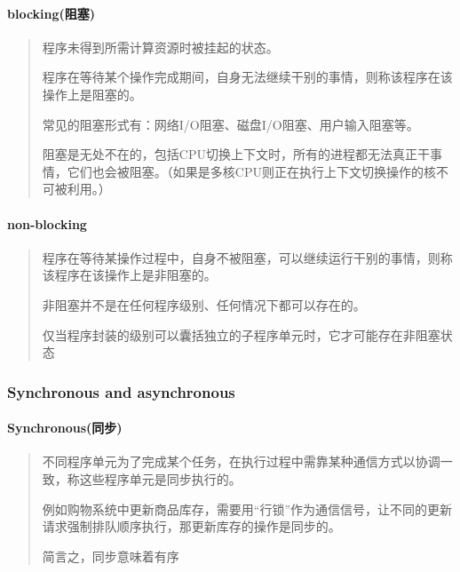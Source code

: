 \documentclass[11pt]{article}
\begin{document}
    \hypertarget{blockingux963bux585e}{%
\paragraph{blocking(阻塞)}\label{blockingux963bux585e}}

\begin{quote}
程序未得到所需计算资源时被挂起的状态。

程序在等待某个操作完成期间，自身无法继续干别的事情，则称该程序在该操作上是阻塞的。

常见的阻塞形式有：网络I/O阻塞、磁盘I/O阻塞、用户输入阻塞等。

阻塞是无处不在的，包括CPU切换上下文时，所有的进程都无法真正干事情，它们也会被阻塞。（如果是多核CPU则正在执行上下文切换操作的核不可被利用。）
\end{quote}

\hypertarget{non-blocking}{%
\paragraph{non-blocking}\label{non-blocking}}

\begin{quote}
程序在等待某操作过程中，自身不被阻塞，可以继续运行干别的事情，则称该程序在该操作上是非阻塞的。

非阻塞并不是在任何程序级别、任何情况下都可以存在的。

仅当程序封装的级别可以囊括独立的子程序单元时，它才可能存在非阻塞状态
\end{quote}

    \hypertarget{synchronous-and-asynchronous}{%
\subsubsection{Synchronous and
asynchronous}\label{synchronous-and-asynchronous}}

    \hypertarget{synchronousux540cux6b65}{%
\paragraph{Synchronous(同步)}\label{synchronousux540cux6b65}}

\begin{quote}
不同程序单元为了完成某个任务，在执行过程中需靠某种通信方式以协调一致，称这些程序单元是同步执行的。

例如购物系统中更新商品库存，需要用``行锁''作为通信信号，让不同的更新请求强制排队顺序执行，那更新库存的操作是同步的。

简言之，同步意味着有序
\end{quote}
\end{document}
